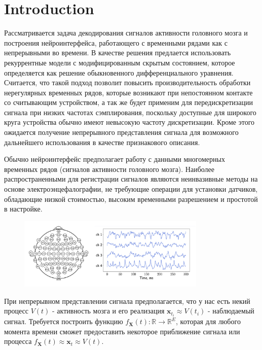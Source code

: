 \newcommand{\vect}[1]{\textbf{#1}}

\section{Introduction}

Рассматривается задача декодирования сигналов активности головного мозга и построения нейроинтерфейса, работающего с временными рядами как с непрерывными во времени. В качестве решения предлается использовать рекуррентные модели с модифицированным скрытым состоянием, которое определяется как решение обыкновенного дифференциального уравнения. Считается, что такой подход позволит повысить производительность обработки нерегулярных временных рядов, которые возникают при непостоянном контакте со считывающим устройством, а так же будет применим для передискретизации сигнала при низких частотах сэмплирования, поскольку доступные для широкого круга устройства обычно имеют невысокую частоту дискретизации. Кроме этого ожидается получение непрерывного представления сигнала для возможного дальнейшего использования в качестве признакового описания.  

Обычно нейроинтерфейс предполагает работу с данными многомерных временных рядов (сигналов активности головного мозга). Наиболее распространенными для регистрации сигналов являются неинвазивные методы на основе электроэнцефалографии, не требующие операции для установки датчиков, обладающие низкой стоимостью, высоким временными разрешением и простотой в настройке. 
\begin{figure}[!h]
	\centering
	\includegraphics[width=0.8\textwidth]{chapters/varenik1/images/electodes-signal.png}
\end{figure}

При непрерывном представлении сигнала предполагается, что у нас есть некий процесс $V(t)$ - активность мозга и его реализация $\vect x_{t_i} \approx V(t_i)$ - наблюдаемый сигнал. Требуется построить функцию $f_{\vect X}(t): \mathbb{R}\to \mathbb{R}^E$, которая для любого момента времени сможет предоставить некоторое приближение сигнала или процесса $f_{\vect X}(t) \approx \vect x_t \approx V(t)$.

